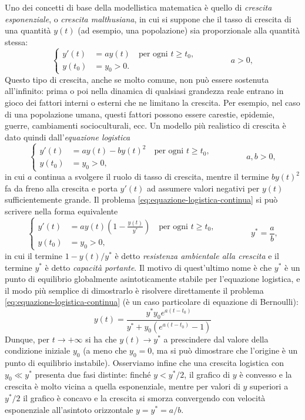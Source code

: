 Uno dei concetti di base della modellistica matematica è quello di
\emph{crescita esponenziale}, o \emph{crescita malthusiana}, in cui si
suppone che il tasso di crescita di una quantità $y(t)$ (ad esempio,
una popolazione) sia proporzionale alla quantità stessa:
\[
\left\{
\begin{aligned}
y'(t)  &= a y(t) \quad \text{per ogni $t \geq t_0$}, \\
y(t_0) &= y_0 > 0.
\end{aligned}
\right.
\qquad \qquad a > 0,
\]
Questo tipo di crescita, anche se molto comune, non può essere sostenuta
all'infinito: prima o poi nella dinamica di qualsiasi grandezza reale entrano
in gioco dei fattori interni o esterni che ne limitano la crescita.
Per esempio, nel caso di una popolazione umana, questi fattori possono essere
carestie, epidemie, guerre, cambiamenti socioculturali, ecc.
Un modello più realistico di crescita è dato quindi dall'\emph{equazione logistica}
\begin{equation} \label{eq:equazione-logistica-continua}
\left\{
\begin{aligned}
y'(t)  &= a y(t) - b y(t)^2 \quad \text{per ogni $t \geq t_0$}, \\
y(t_0) &= y_0 > 0,
\end{aligned}
\right.
\qquad \qquad a,b > 0,
\end{equation}
in cui $a$ continua a svolgere il ruolo di tasso di crescita, mentre il termine
$by(t)^2$ fa da freno alla crescita e porta $y'(t)$ ad assumere valori negativi
per $y(t)$ sufficientemente grande. Il problema \eqref{eq:equazione-logistica-continua}
si può scrivere nella forma equivalente
\[
\left\{
\begin{aligned}
y'(t)  &= a y(t) \left( 1 - \frac{y(t)}{y^*} \right) \quad \text{per ogni $t \geq t_0$}, \\
y(t_0) &= y_0 > 0,
\end{aligned}
\right.
\qquad \qquad y^* = \frac{a}{b},
\]
in cui il termine $1-y(t)/y^*$ è detto \emph{resistenza ambientale alla crescita}
e il termine $y^*$ è detto \emph{capacità portante}. Il motivo di quest'ultimo
nome è che $y^*$ è un punto di equilibrio globalmente asintoticamente stabile
per l'equazione logistica, e il modo più semplice di dimostrarlo è risolvere
direttamente il problema \eqref{eq:equazione-logistica-continua}
(è un caso particolare di equazione di Bernoulli):
\[
y(t) = \frac{y^* y_0 e^{a(t-t_0)}}{y^* + y_0 \left( e^{a(t-t_0)}-1 \right)}
\]
Dunque, per $t \to +\infty$ si ha che $y(t) \to y^*$ a prescindere dal valore
della condizione iniziale $y_0$ (a meno che $y_0 = 0$, ma si può dimostrare
che l'origine è un punto di equilibrio instabile).
Osserviamo infine che una crescita logistica con $y_0 \ll y^*$ presenta
due fasi distinte: finché $y < y^*/2$, il grafico di $y$ è convesso e la
crescita è molto vicina a quella esponenziale, mentre per valori di $y$
superiori a $y^*/2$ il grafico è concavo e la crescita si smorza convergendo
con velocità esponenziale all'asintoto orizzontale $y = y^* = a/b$.

